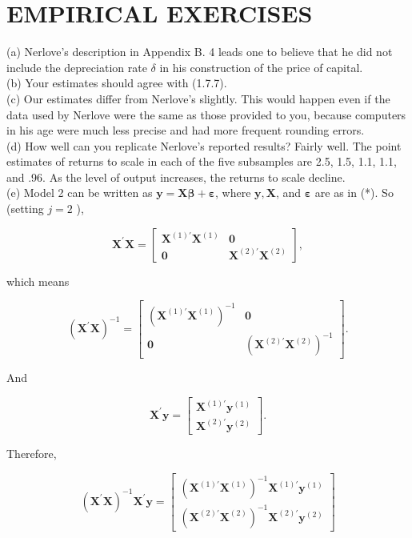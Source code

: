 \documentclass[10pt]{article}
\begin{document}
\section*{EMPIRICAL EXERCISES}
(a) Nerlove's description in Appendix B. 4 leads one to believe that he did not include the depreciation rate $\delta$ in his construction of the price of capital.\\
(b) Your estimates should agree with (1.7.7).\\
(c) Our estimates differ from Nerlove's slightly. This would happen even if the data used by Nerlove were the same as those provided to you, because computers in his age were much less precise and had more frequent rounding errors.\\
(d) How well can you replicate Nerlove's reported results? Fairly well. The point estimates of returns to scale in each of the five subsamples are 2.5, 1.5, 1.1, 1.1, and .96. As the level of output increases, the returns to scale decline.\\
(e) Model 2 can be written as $\mathbf{y}=\mathbf{X} \boldsymbol{\beta}+\boldsymbol{\varepsilon}$, where $\mathbf{y}, \mathbf{X}$, and $\boldsymbol{\varepsilon}$ are as in (*). So (setting $j=2$ ),

$$
\mathbf{X}^{\prime} \mathbf{X}=\left[\begin{array}{cc}
\mathbf{X}^{(1) \prime} \mathbf{X}^{(1)} & \mathbf{0} \\
\mathbf{0} & \mathbf{X}^{(2) \prime} \mathbf{X}^{(2)}
\end{array}\right],
$$

which means

$$
\left(\mathbf{X}^{\prime} \mathbf{X}\right)^{-1}=\left[\begin{array}{cc}
\left(\mathbf{X}^{(1) \prime} \mathbf{X}^{(1)}\right)^{-1} & \mathbf{0} \\
\mathbf{0} & \left(\mathbf{X}^{(2) \prime} \mathbf{X}^{(2)}\right)^{-1}
\end{array}\right] .
$$

And

$$
\mathbf{X}^{\prime} \mathbf{y}=\left[\begin{array}{l}
\mathbf{X}^{(1) \prime} \mathbf{y}^{(1)} \\
\mathbf{X}^{(2) \prime} \mathbf{y}^{(2)}
\end{array}\right] .
$$

Therefore,

$$
\left(\mathbf{X}^{\prime} \mathbf{X}\right)^{-1} \mathbf{X}^{\prime} \mathbf{y}=\left[\begin{array}{l}
\left(\mathbf{X}^{(1) \prime} \mathbf{X}^{(1)}\right)^{-1} \mathbf{X}^{(1) \prime} \mathbf{y}^{(1)} \\
\left(\mathbf{X}^{(2) \prime} \mathbf{X}^{(2)}\right)^{-1} \mathbf{X}^{(2) \prime} \mathbf{y}^{(2)}
\end{array}\right]
$$
\end{document}

